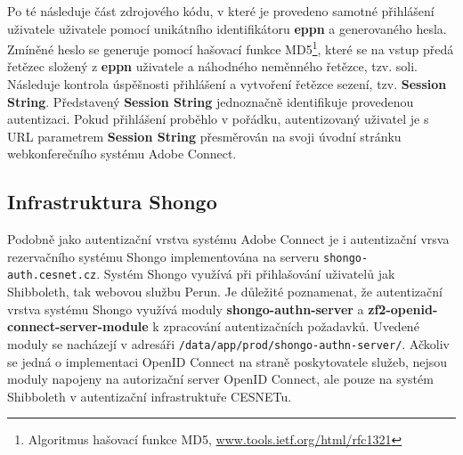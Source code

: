 \documentclass[
  printed, %
  twoside, %
  table,   %
  nolof,     %
  nolot,     %
]{fithesis3}
\begin{document}
Po té následuje část zdrojového kódu, v které je provedeno samotné přihlášení uživatele uživatele pomocí unikátního identifikátoru \textbf{eppn} a generovaného hesla. Zmíněné heslo se generuje pomocí hašovací funkce MD5\footnote{Algoritmus hašovací funkce MD5, \url{www.tools.ietf.org/html/rfc1321}}, které se na vstup předá řetězec složený z \textbf{eppn} uživatele a náhodného neměnného řetězce, tzv. soli. Následuje kontrola úspěšnosti přihlášení a vytvoření řetězce sezení, tzv. \textbf{Session String}. Představený \textbf{Session String} jednoznačně identifikuje provedenou autentizaci. Pokud přihlášení proběhlo v pořádku, autentizovaný uživatel je s URL parametrem \textbf{Session String} přesměrován na svoji úvodní stránku webkonferečního systému Adobe Connect.      

\subsection{Infrastruktura Shongo}
Podobně jako autentizační vrstva systému Adobe Connect je i autentizační vrsva rezervačního systému Shongo implementována na serveru \texttt{shongo-auth.cesnet.cz}. Systém Shongo využívá při přihlašování uživatelů jak Shibboleth, tak webovou službu Perun. Je důležité poznamenat, že autentizační vrstva systému Shongo využívá moduly \textbf{shongo-authn-server} a \textbf{zf2-openid-connect-server-module} k zpracování autentizačních požadavků. Uvedené moduly se nacházejí v adresáři \texttt{/data/app/prod/shongo-authn-server/}. Ačkoliv se jedná o implementaci OpenID Connect na straně poskytovatele služeb, nejsou moduly napojeny na autorizační server OpenID Connect, ale pouze na systém Shibboleth v autentizační infrastruktuře CESNETu. \par
\end{document}
